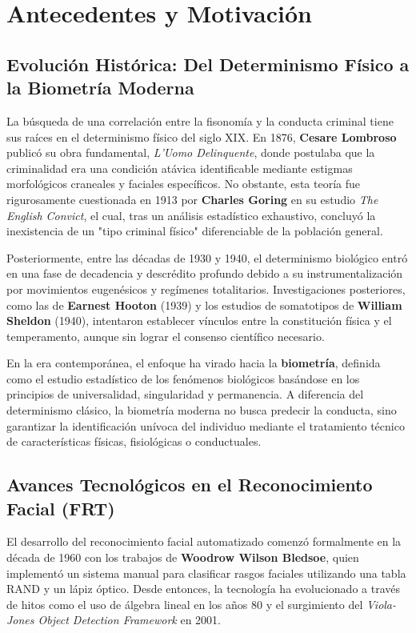 \section{Antecedentes y Motivación}

\subsection{Evolución Histórica: Del Determinismo Físico a la Biometría Moderna}

La búsqueda de una correlación entre la fisonomía y la conducta criminal tiene sus raíces en el determinismo físico del siglo XIX. En 1876, \textbf{Cesare Lombroso} publicó su obra fundamental, \textit{L'Uomo Delinquente}, donde postulaba que la criminalidad era una condición atávica identificable mediante estigmas morfológicos craneales y faciales específicos. No obstante, esta teoría fue rigurosamente cuestionada en 1913 por \textbf{Charles Goring} en su estudio \textit{The English Convict}, el cual, tras un análisis estadístico exhaustivo, concluyó la inexistencia de un "tipo criminal físico" diferenciable de la población general.

Posteriormente, entre las décadas de 1930 y 1940, el determinismo biológico entró en una fase de decadencia y descrédito profundo debido a su instrumentalización por movimientos eugenésicos y regímenes totalitarios. Investigaciones posteriores, como las de \textbf{Earnest Hooton} (1939) y los estudios de somatotipos de \textbf{William Sheldon} (1940), intentaron establecer vínculos entre la constitución física y el temperamento, aunque sin lograr el consenso científico necesario.

En la era contemporánea, el enfoque ha virado hacia la \textbf{biometría}, definida como el estudio estadístico de los fenómenos biológicos basándose en los principios de universalidad, singularidad y permanencia. A diferencia del determinismo clásico, la biometría moderna no busca predecir la conducta, sino garantizar la identificación unívoca del individuo mediante el tratamiento técnico de características físicas, fisiológicas o conductuales.

\subsection{Avances Tecnológicos en el Reconocimiento Facial (FRT)}

El desarrollo del reconocimiento facial automatizado comenzó formalmente en la década de 1960 con los trabajos de \textbf{Woodrow Wilson Bledsoe}, quien implementó un sistema manual para clasificar rasgos faciales utilizando una tabla RAND y un lápiz óptico. Desde entonces, la tecnología ha evolucionado a través de hitos como el uso de álgebra lineal en los años 80 y el surgimiento del \textit{Viola-Jones Object Detection Framework} en 2001.

